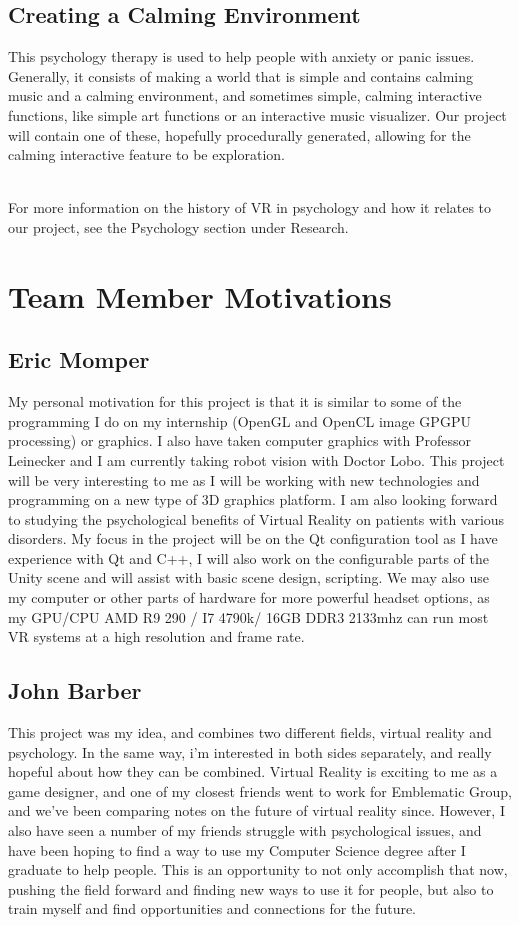 \documentclass[a4paper,10pt]{article}
\begin{document}
	\subsection{Creating a Calming Environment}
	This psychology therapy is used to help people with anxiety or panic issues.  Generally, it consists of making a world that is simple and contains calming music and a calming environment, and sometimes simple, calming interactive functions, like simple art functions or an interactive music visualizer.  Our project will contain one of these, hopefully procedurally generated, allowing for the calming interactive feature to be exploration.
	\par~\\ 
	For more information on the history of VR in psychology and how it relates to our project, see the Psychology section under Research.
	\pagebreak
	
	
	\section{Team Member Motivations}
	\subsection{Eric Momper}
	My personal motivation for this project is that it is similar to some of the programming I do on my internship (OpenGL and OpenCL image GPGPU processing) or graphics.
	I also have taken computer graphics with Professor Leinecker and I am currently taking robot vision with Doctor Lobo. This project will be very interesting to me as  
	I will be working with new technologies and programming on a new type of 3D graphics platform. I am also looking forward to studying the psychological benefits
	of Virtual Reality on patients with various disorders. My focus in the project will be on the Qt configuration tool as I have experience with Qt and C++, I will 
	also work on the configurable parts of the Unity scene and will assist with basic scene design, scripting. We may also use my computer or other parts of hardware for more powerful headset options, 
	as my GPU/CPU AMD R9 290 / I7 4790k/ 16GB DDR3 2133mhz can run most VR systems at a high resolution and frame rate. 
	
	\subsection{John Barber}
	This project was my idea, and combines two different fields, virtual reality and psychology.  In the same way, i'm interested in both sides separately, and really hopeful about how they can be combined.  Virtual Reality is exciting to me as a game designer, 
	and one of my closest friends went to work for Emblematic Group, and we've been comparing notes on the future of virtual reality since.  However, I also have seen a number of my friends struggle with psychological issues, and have been hoping to find a way to use my Computer Science degree after I graduate to help people.  This is an opportunity to not only accomplish that now, pushing the field forward and finding new ways to use it for people, but also to train myself and find opportunities and connections for the future.
	
\end{document}
